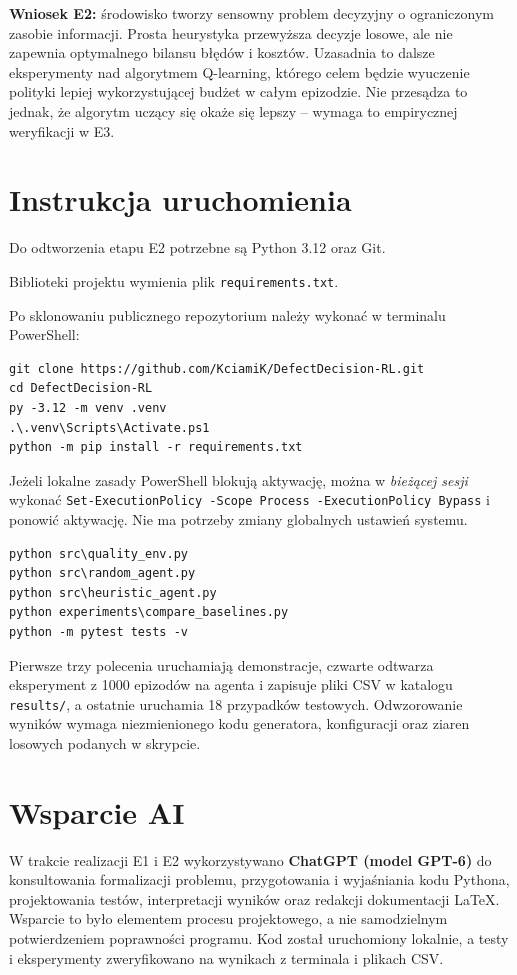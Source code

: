 \documentclass[12pt]{article}
\begin{document}
\textbf{Wniosek E2:} środowisko tworzy sensowny problem decyzyjny o ograniczonym zasobie informacji. Prosta heurystyka przewyższa decyzje losowe, ale nie zapewnia optymalnego bilansu błędów i kosztów. Uzasadnia to dalsze eksperymenty nad algorytmem Q-learning, którego celem będzie wyuczenie polityki lepiej wykorzystującej budżet w całym epizodzie. Nie przesądza to jednak, że algorytm uczący się okaże się lepszy -- wymaga to empirycznej weryfikacji w E3.

\section{Instrukcja uruchomienia}

Do odtworzenia etapu E2 potrzebne są Python 3.12 oraz Git.\par\noindent Biblioteki projektu wymienia plik \texttt{requirements.txt}.\par\noindent Po sklonowaniu publicznego repozytorium należy wykonać w terminalu PowerShell:
\begin{verbatim}
git clone https://github.com/KciamiK/DefectDecision-RL.git
cd DefectDecision-RL
py -3.12 -m venv .venv
.\.venv\Scripts\Activate.ps1
python -m pip install -r requirements.txt
\end{verbatim}

Jeżeli lokalne zasady PowerShell blokują aktywację, można w \emph{bieżącej sesji} wykonać \texttt{Set-ExecutionPolicy -Scope Process -ExecutionPolicy Bypass} i ponowić aktywację. Nie ma potrzeby zmiany globalnych ustawień systemu.

\begin{verbatim}
python src\quality_env.py
python src\random_agent.py
python src\heuristic_agent.py
python experiments\compare_baselines.py
python -m pytest tests -v
\end{verbatim}

Pierwsze trzy polecenia uruchamiają demonstracje, czwarte odtwarza eksperyment z 1000 epizodów na agenta i zapisuje pliki CSV w katalogu \texttt{results/}, a ostatnie uruchamia 18 przypadków testowych. Odwzorowanie wyników wymaga niezmienionego kodu generatora, konfiguracji oraz ziaren losowych podanych w skrypcie.

\section{Wsparcie AI}

W trakcie realizacji E1 i E2 wykorzystywano \textbf{ChatGPT (model GPT-6)} do konsultowania formalizacji problemu, przygotowania i wyjaśniania kodu Pythona, projektowania testów, interpretacji wyników oraz redakcji dokumentacji LaTeX. Wsparcie to było elementem procesu projektowego, a nie samodzielnym potwierdzeniem poprawności programu. Kod został uruchomiony lokalnie, a testy i eksperymenty zweryfikowano na wynikach z terminala i plikach CSV.
\end{document}
